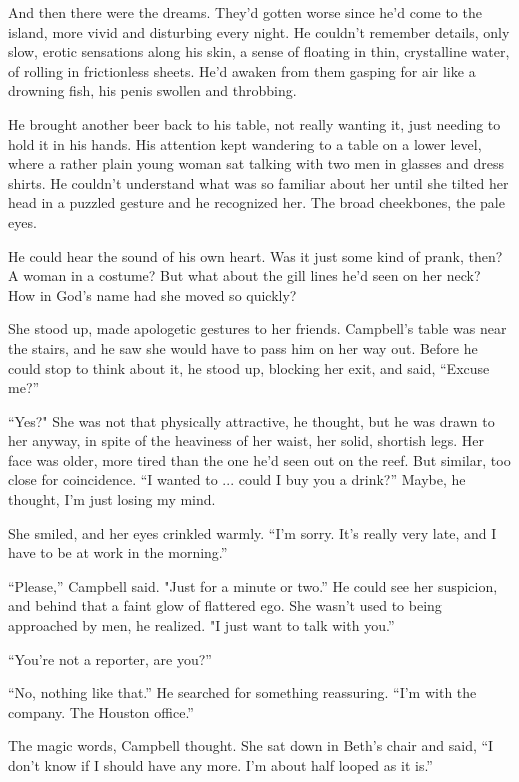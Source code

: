 And then there were the dreams. They'd gotten worse since he'd come to the island, more vivid and disturbing every night. He couldn't remember details, only slow, erotic sensations along his skin, a sense of floating in thin, crystalline water, of rolling in frictionless sheets. He'd awaken from them gasping for air like a drowning fish, his penis swollen and throbbing.

He brought another beer back to his table, not really wanting it, just needing to hold it in his hands. His attention kept wandering to a table on a lower level, where a rather plain young woman sat talking with two men in glasses and dress shirts. He couldn't understand what was so familiar about her until she tilted her head in a puzzled gesture and he recognized her. The broad cheekbones, the pale eyes.

He could hear the sound of his own heart. Was it just some kind of prank, then? A woman in a costume? But what about the gill lines he'd seen on her neck? How in God's name had she moved so quickly?

She stood up, made apologetic gestures to her friends. Campbell's table was near the stairs, and he saw she would have to pass him on her way out. Before he could stop to think about it, he stood up, blocking her exit, and said, ``Excuse me?''

``Yes?" She was not that physically attractive, he thought, but he was drawn to her anyway, in spite of the heaviness of her waist, her solid, shortish legs. Her face was older, more tired than the one he'd seen out on the reef. But similar, too close for coincidence. ``I wanted to ... could I buy you a drink?'' Maybe, he thought, I'm just losing my mind.

She smiled, and her eyes crinkled warmly. ``I'm sorry. It's really very late, and I have to be at work in the morning.''

``Please,'' Campbell said. "Just for a minute or two.'' He could see her suspicion, and behind that a faint glow of flattered ego. She wasn't used to being approached by men, he realized. "I just want to talk with you.''

``You're not a reporter, are you?''

``No, nothing like that.'' He searched for something reassuring. ``I'm with the company. The Houston office.''

The magic words, Campbell thought. She sat down in Beth's chair and said, ``I don't know if I should have any more. I'm about half looped as it is.''

